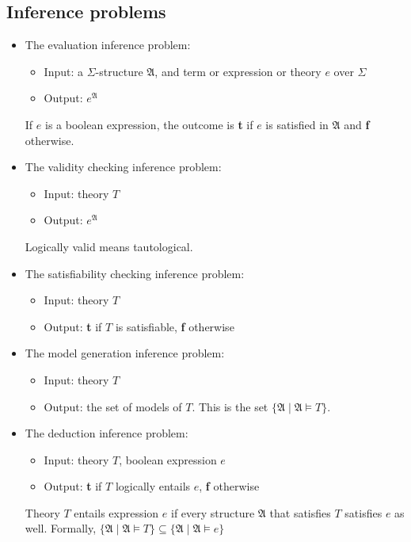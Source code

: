 \documentclass[10pt,a4paper]{article}
\theoremstyle{definition}
\begin{document}
\subsection{Inference problems}
\begin{itemize}
	\item The evaluation inference problem: 
		\begin{itemize}
			\item Input: a $\Sigma$-structure $\mathfrak{A}$, and term or expression or theory $e$ over $\Sigma$
			\item Output: $e^\mathfrak{A}$
		\end{itemize}
		If $e$ is a boolean expression, the outcome is \textbf{t} if $e$ is satisfied in $\mathfrak{A}$ and \textbf{f} otherwise.
	\item The validity checking inference problem: 
		\begin{itemize}
			\item Input: theory $T$
			\item Output: $e^\mathfrak{A}$
		\end{itemize}
		Logically valid means tautological.
	\item The satisfiability checking inference problem: 
		\begin{itemize}
			\item Input: theory $T$
			\item Output: \textbf{t} if $T$ is satisfiable, \textbf{f} otherwise
		\end{itemize}
	\item The model generation inference problem: 
		\begin{itemize}
			\item Input: theory $T$
			\item Output: the set of models of $T$. This is the set $\{\mathfrak{A} \mid \mathfrak{A} \models T\}$.
		\end{itemize}
	\item The deduction inference problem: 
		\begin{itemize}
			\item Input: theory $T$, boolean expression $e$
			\item Output: \textbf{t} if $T$ logically entails $e$, \textbf{f} otherwise
		\end{itemize}
		Theory $T$ entails expression $e$ if every structure $\mathfrak{A}
		$ that satisfies $T$ satisfies $e$ as well. Formally, $\{\mathfrak{A} \mid \mathfrak{A} \models T\} \subseteq \{\mathfrak{A} \mid \mathfrak{A} \models e \}$
\end{itemize}
\end{document}
